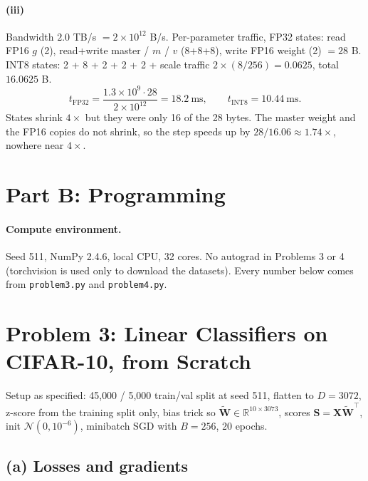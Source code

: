 \documentclass[11pt]{article}
\newcommand{\mat}[1]{\mathbf{#1}}
\begin{document}
\paragraph{(iii)}
Bandwidth \(2.0\) TB/s \(=2\times 10^{12}\) B/s.
Per-parameter traffic, FP32 states: read FP16 \(g\) (2),
read+write master / \(m\) / \(v\) (8+8+8), write FP16 weight (2)
\(=28\) B.
INT8 states: 2 + 8 + 2 + 2 + 2 + scale traffic
\(2\times(8/256)=0.0625\), total \(16.0625\) B.
\[
t_{\mathrm{FP32}}=\frac{1.3\times10^9\cdot 28}{2\times10^{12}}=18.2\ \mathrm{ms},
\qquad
t_{\mathrm{INT8}}=10.44\ \mathrm{ms}.
\]
States shrink \(4\times\) but they were only 16 of the 28 bytes. The
master weight and the FP16 copies do not shrink, so the step speeds up
by \(28/16.06\approx 1.74\times\), nowhere near \(4\times\).

\newpage
\section*{Part B: Programming}

\paragraph{Compute environment.}
Seed 511, NumPy 2.4.6, local CPU, 32 cores.
No autograd in Problems 3 or 4 (torchvision is used only to download
the datasets). Every number below comes from \texttt{problem3.py} and
\texttt{problem4.py}.

\section{Problem 3: Linear Classifiers on CIFAR-10, from Scratch}

Setup as specified: 45{,}000 / 5{,}000 train/val split at seed 511,
flatten to \(D=3072\), z-score from the training split only, bias trick
so \(\widetilde{\mat{W}}\in\mathbb{R}^{10\times 3073}\), scores
\(\mat{S}=\mat{X}\widetilde{\mat{W}}^\top\), init
\(\mathcal{N}(0,10^{-6})\), minibatch SGD with \(B=256\), 20 epochs.

\subsection*{(a) Losses and gradients}
\end{document}
